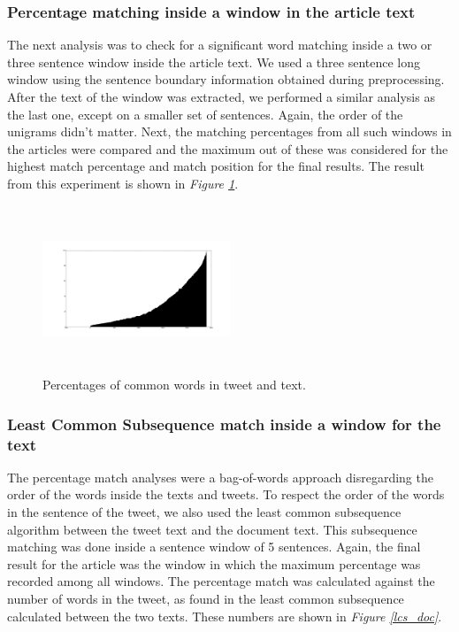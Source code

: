 \documentclass[11pt]{article}
\newcommand{\figref}[1]{\textit{Figure \ref{#1}}}
\begin{document}
\subsubsection{Percentage matching inside a window in the article text}

The next analysis was to check for a significant word matching inside a two or three sentence window inside the article text. We used a three sentence long window using the sentence boundary information obtained during preprocessing. After the text of the window was extracted, we performed a similar analysis as the last one, except on a smaller set of sentences. Again, the order of the unigrams didn't matter. Next, the matching percentages from all such windows in the articles were compared and the maximum out of these was considered for the highest match percentage and match position for the final results. The result from this experiment is shown in \figref{fig:percentages}. 

\begin{figure}[htbp]
\centering
\includegraphics[width=0.5\textwidth, height=5cm]{percentages}
\caption{Percentages of common words in tweet and text.}
\label{fig:percentages}
\end{figure}

\subsubsection{Least Common Subsequence match inside a window for the text}

The percentage match analyses were a bag-of-words approach disregarding the order of the words inside the texts and tweets. To respect the order of the words in the sentence of the tweet, we also used the least common subsequence algorithm between the tweet text and the document text. This subsequence matching was done inside a sentence window of 5 sentences. Again, the final result for the article was the window in which the maximum percentage was recorded among all windows. The percentage match was calculated against the number of words in the tweet, as found in the least common subsequence calculated between the two texts. These numbers are shown in \figref{lcs_doc}.
\end{document}
